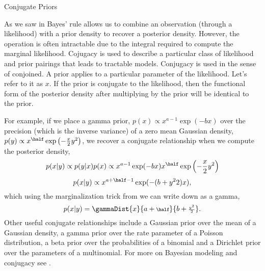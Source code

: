 \begin{boxfloat}
  \caption{Conjugate Priors}\label{box:conjugacy}
  \boxfontsize

  As we saw in  Bayes' rule
  allows us to combine an observation (through a likelihood) with a
  prior density to recover a posterior density. However, the operation
  is often intractable due to the integral required to compute the
  marginal likelihood. Cojugacy is used to describe a particular class
  of likelihood and prior pairings that leads to tractable
  models. Conjugacy is used in the sense of conjoined. A prior applies
  to a particular parameter of the likelihood. Let's refer to it as
  $x$. If the prior is conjugate to the likelihood, then the
  functional form of the posterior density after multiplying by the
  prior will be identical to the prior.

  For example, if we place a gamma prior, $p(x) \propto
  x^{a-1}\exp(-bx)$ over the precision (which is the inverse variance)
  of a zero mean Gaussian density, $p(y) \propto
  x^{\half}\exp\left(-\frac{x}{2}y^2\right)$, we recover a
  conjugate relationship when we compute the posterior density,
  \[
  p(x|y) \propto p(y|x)p(x) \propto
  x^{a-1}\exp(-bx)x^{\half}\exp\left(-\frac{x}{2}y^2\right)
  \]
  \[
  p(x|y) \propto x^{a+\half-1}\exp(-(b+{y^2}{2})x),
  \]
  which using the marginalization trick from
   we can write down as a gamma,
  \[
  p(x|y) = \gammaDist{x}{a+{\scriptstyle \half}}{b+{\scriptstyle
      \frac{y^2}{2}}}.
  \]
  Other useful conjugate relationships include a Gaussian prior over
  the mean of a Gaussian density, a gamma prior over the rate
  parameter of a Poisson distribution, a beta prior over the
  probabilities of a binomial and a Dirichlet prior over the
  parameters of a multinomial. For more on Bayesian modeling and
  conjugacy see \citealp{Gelman:bayesian95}.
\end{boxfloat}

